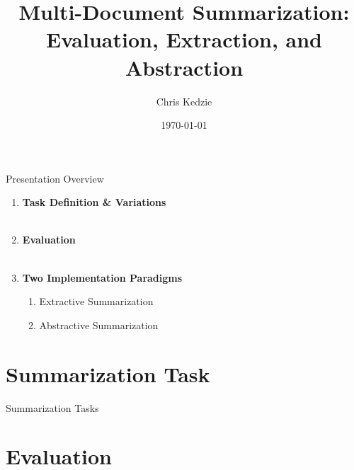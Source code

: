 \documentclass[xcolor={table}]{beamer}
\title{Multi-Document Summarization: Evaluation, Extraction, and Abstraction}
\date{\today}
\author{Chris Kedzie}
\institute{Dept. of Computer Science, Columbia University}
\begin{document}
  \maketitle


\begin{frame}{Presentation Overview}

\begin{enumerate}
    \item \textbf{Task Definition \& Variations}
        ~\\~\\
    \item \textbf{Evaluation}
        ~\\~\\
    \item \textbf{Two Implementation Paradigms}
\begin{enumerate}
\item Extractive Summarization
\item Abstractive Summarization
\end{enumerate}
\end{enumerate}

\end{frame}


\section{Summarization Task}




\begin{frame}{Summarization Tasks}
\end{frame}





\section{Evaluation}
\end{document}

